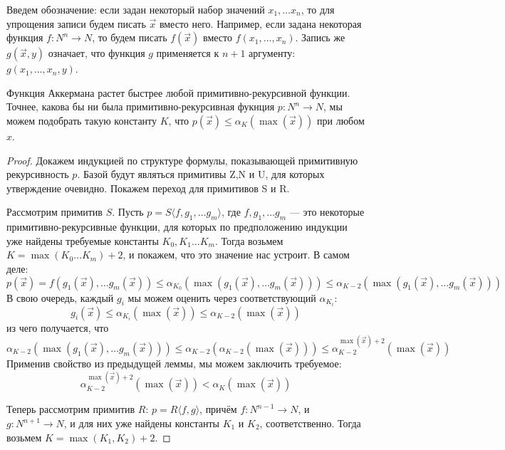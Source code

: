 Введем обозначение: если задан некоторый набор значений
$x_1, \dots x_n$, то для упрощения записи будем писать $\overrightarrow{x}$
вместо него. Например, если задана некоторая функция $f: N^n \rightarrow N$,
то будем писать $f(\overrightarrow{x})$ вместо $f(x_1,\dots,x_n)$.
Запись же $g(\overrightarrow{x},y)$ означает, что функция $g$ применяется к
$n+1$ аргументу: $g(x_1, \dots, x_n, y)$.

\begin{theorem}
Функция Аккермана растет быстрее любой примитивно-рекурсивной функции. Точнее,
какова бы ни была примитивно-рекурсивная фукнция $p: N^n \rightarrow N$, 
мы можем подобрать такую константу $K$, что 
$p(\overrightarrow{x}) \le \alpha_K(\max(\overrightarrow{x}))$ 
при любом $x$. 
\end{theorem}

\begin{proof}
Докажем индукцией по структуре формулы, показывающей примитивную 
рекурсивность $p$.
Базой будут являться примитивы Z,N и U, для которых утверждение очевидно.
Покажем переход для примитивов S и R.

Рассмотрим примитив $S$. Пусть $p = S\langle f,g_1,\dots g_m \rangle$,
где $f, g_1, \dots g_m$ --- это некоторые примитивно-рекурсивные функции, 
для которых по предположению индукции уже найдены требуемые константы 
$K_0, K_1 \dots K_m$.
Тогда возьмем $K = \max (K_0 \dots K_m)+2$, и покажем, что это значение нас
устроит.
В самом деле: 
$$p(\overrightarrow{x}) = f(g_1(\overrightarrow{x}), \dots g_m(\overrightarrow{x}))
\le \alpha_{K_0}(\max (g_1(\overrightarrow{x}), \dots g_m(\overrightarrow{x})))
\le \alpha_{K-2}(\max (g_1(\overrightarrow{x}), \dots g_m(\overrightarrow{x})))$$
В свою очередь, каждый $g_i$ мы можем оценить через соответствующий $\alpha_{K_i}$:
$$g_i(\overrightarrow{x}) \le \alpha_{K_i}(\max(\overrightarrow{x})) \le \alpha_{K-2}(\max(\overrightarrow{x}))$$
из чего получается, что 
$$\alpha_{K-2}(\max (g_1(\overrightarrow{x}), \dots g_m(\overrightarrow{x}))) \le 
\alpha_{K-2}(\alpha_{K-2}(\max(\overrightarrow{x}))) \le \alpha_{K-2}^{\max(\overrightarrow{x})+2}(\max(\overrightarrow{x}))$$
Применив свойство из предыдущей леммы, мы можем заключить требуемое:
$$\alpha_{K-2}^{\max(\overrightarrow{x})+2}(\max(\overrightarrow{x})) < \alpha_K(\max(\overrightarrow{x}))$$

Теперь рассмотрим примитив $R$: $p = R\langle f,g \rangle$,
причём $f: N^{n-1} \rightarrow N$, и $g: N^{n+1} \rightarrow N$,
и для них уже найдены константы $K_1$ и $K_2$, соответственно.
Тогда возьмем $K = \max(K_1, K_2)+2$.


\end{proof}
